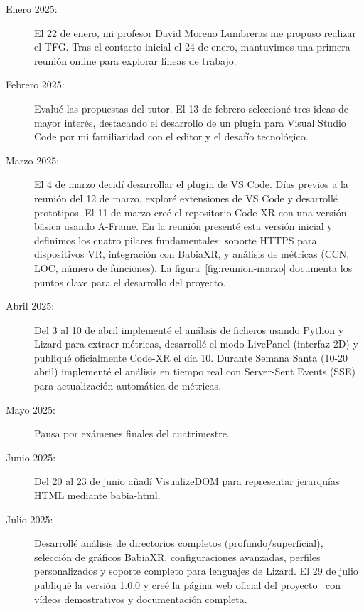 \documentclass[a4paper, 12pt]{book}
\begin{document}
\begin{description}
    \item[Enero 2025:] El 22 de enero, mi profesor David Moreno Lumbreras me propuso realizar el TFG. Tras el contacto inicial el 24 de enero, mantuvimos una primera reunión online para explorar líneas de trabajo.

    \item[Febrero 2025:] Evalué las propuestas del tutor. El 13 de febrero seleccioné tres ideas de mayor interés, destacando el desarrollo de un plugin para Visual Studio Code por mi familiaridad con el editor y el desafío tecnológico.

    \item[Marzo 2025:] El 4 de marzo decidí desarrollar el plugin de VS Code. Días previos a la reunión del 12 de marzo, exploré extensiones de VS Code y desarrollé prototipos. El 11 de marzo creé el repositorio Code-XR con una versión básica usando A-Frame. En la reunión presenté esta versión inicial y definimos los cuatro pilares fundamentales: soporte HTTPS para dispositivos VR, integración con BabiaXR, y análisis de métricas (CCN, LOC, número de funciones). La figura~\ref{fig:reunion-marzo} documenta los puntos clave para el desarrollo del proyecto.

    \item[Abril 2025:] Del 3 al 10 de abril implementé el análisis de ficheros usando Python y Lizard para extraer métricas, desarrollé el modo LivePanel (interfaz 2D) y publiqué oficialmente Code-XR el día 10. Durante Semana Santa (10-20 abril) implementé el análisis en tiempo real con Server-Sent Events (SSE) para actualización automática de métricas.

    \item[Mayo 2025:] Pausa por exámenes finales del cuatrimestre.

    \item[Junio 2025:] Del 20 al 23 de junio añadí VisualizeDOM para representar jerarquías HTML mediante babia-html.

    \item[Julio 2025:] Desarrollé análisis de directorios completos (profundo/superficial), selección de gráficos BabiaXR, configuraciones avanzadas, perfiles personalizados y soporte completo para lenguajes de Lizard. El 29 de julio publiqué la versión 1.0.0 y creé la página web oficial del proyecto~\cite{montes2025web} con vídeos demostrativos y documentación completa.
\end{description}
\end{document}
